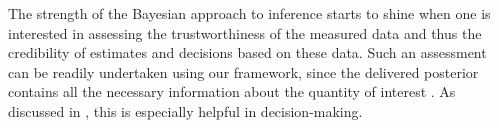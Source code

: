 The strength of the Bayesian approach to inference starts to shine when one is
interested in assessing the trustworthiness of the measured data and thus the
credibility of estimates and decisions based on these data. Such an assessment
can be readily undertaken using our framework, since the delivered posterior
contains all the necessary information about the quantity of interest \g. As
discussed in , this is especially helpful in
decision-making.
